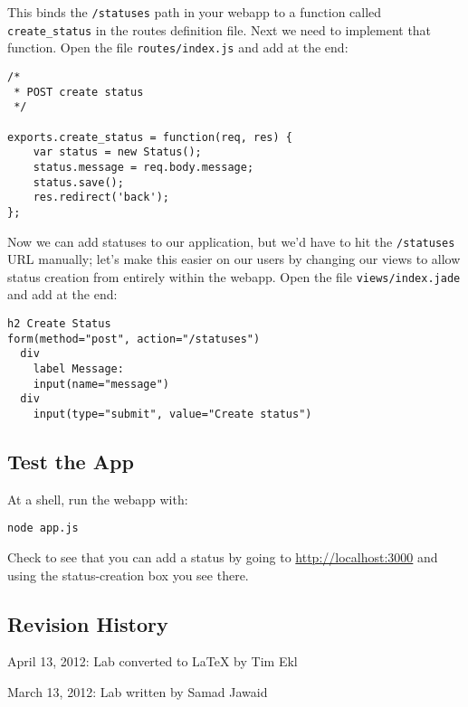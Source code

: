 \documentclass{article}
\begin{document}
This binds the \verb!/statuses! path in your webapp to a function called \verb!create_status! in the routes definition file. Next we need to implement that function. Open the file \verb!routes/index.js! and add at the end:

\begin{verbatim}
/*
 * POST create status
 */

exports.create_status = function(req, res) {
    var status = new Status();
    status.message = req.body.message;
    status.save();
    res.redirect('back');
};
\end{verbatim}


Now we can add statuses to our application, but we'd have to hit the \verb!/statuses! URL manually; let's make this easier on our users by changing our views to allow status creation from entirely within the webapp. Open the file \verb!views/index.jade! and add at the end:

\begin{verbatim}
h2 Create Status
form(method="post", action="/statuses")
  div
    label Message:
    input(name="message")
  div
    input(type="submit", value="Create status")
\end{verbatim}

\subsection*{Test the App}

At a shell, run the webapp with:

\begin{verbatim}
node app.js
\end{verbatim}

Check to see that you can add a status by going to \href{http://localhost:3000/}{http://localhost:3000} and using the status-creation box you see there.



\subsection*{Revision History}
\begin{itemize*}
\item April 13, 2012: Lab converted to LaTeX by Tim Ekl
\item March 13, 2012: Lab written by Samad Jawaid
\end{itemize*}
\end{document}
